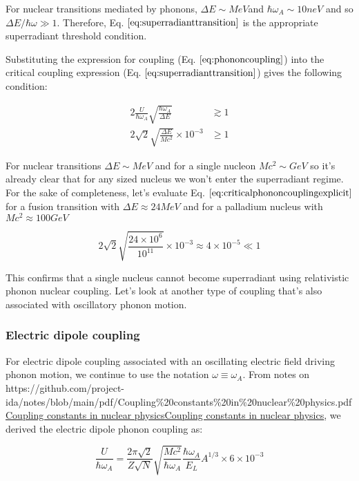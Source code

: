 \documentclass[
]{article}
\let\oldhref\href
\renewcommand{\href}[2]{\ifx#1\urlprefix\oldhref{#1}{#2}\else\uline{\oldhref{#1}{#2}}\fi}
\renewcommand{\[}{\begin{equation}}
\renewcommand{\]}{\end{equation}}
\begin{document}
For nuclear transitions mediated by phonons, \(\Delta E \sim MeV\)and
\(\hbar\omega_A \sim 10neV\) and so \(\Delta E/\hbar\omega \gg 1\).
Therefore, Eq. \(\ref{eq:superradianttransition}\) is the appropriate
superradiant threshold condition.

Substituting the expression for coupling (Eq.
\(\ref{eq:phononcoupling}\)) into the critical coupling expression (Eq.
\(\ref{eq:superradianttransition}\)) gives the following condition:

\[
\begin{aligned}
2\frac{U}{\hbar\omega_A}\sqrt{\frac{\hbar\omega_A}{\Delta E}} &\gtrsim 1 \\
2\sqrt{2} \sqrt{\frac{\Delta E}{M c^2}}  \times 10^{-3} &\ge 1
\end{aligned}
\label{eq:criticalphononcouplingexplicit}
\]

For nuclear transitions \(\Delta E \sim MeV\) and for a single nucleon
\(Mc^2 \sim GeV\) so it's already clear that for any sized nucleus we
won't enter the superradiant regime. For the sake of completeness, let's
evaluate Eq. \(\ref{eq:criticalphononcouplingexplicit}\) for a fusion
transition with \(\Delta E \approx 24MeV\) and for a palladium nucleus
with \(Mc^2 \approx 100GeV\)

\[
2\sqrt{2} \sqrt{\frac{24\times10^6}{10^{11}}}  \times 10^{-3} \approx 4 \times 10^{-5} \ll 1
\label{eq:criticalphononcouplingexplicitnumbers}
\]

This confirms that a single nucleus cannot become superradiant using
relativistic phonon nuclear coupling. Let's look at another type of
coupling that's also associated with oscillatory phonon motion.

\subsubsection{Electric dipole coupling}\label{electric-dipole-coupling}

For electric dipole coupling associated with an oscillating electric
field driving phonon motion, we continue to use the notation
\(\omega \equiv \omega_A\). From notes on
\href{https://github.com/project-ida/notes/blob/main/pdf/Coupling\%20constants\%20in\%20nuclear\%20physics.pdf}{Coupling
constants in nuclear physics}, we derived the electric dipole phonon
coupling as:

\[
\frac{U}{\hbar \omega_A} = \frac{2\pi\sqrt{2}}{Z \sqrt{N}} \sqrt{\frac{M c^2}{\hbar \omega_A}} \frac{\hbar \omega_A}{E_L} A^{1/3} \times 6 \times 10^{-3}
\label{eq:dipolecoupling}
\]
\end{document}
